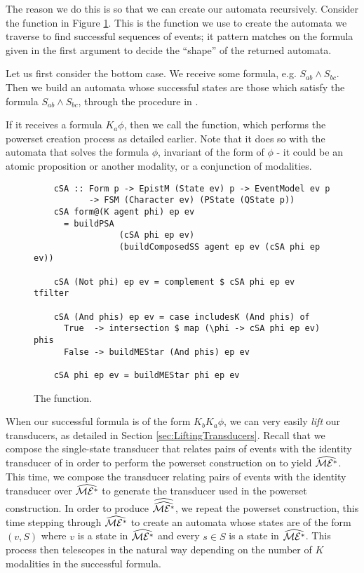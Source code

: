 \documentclass[10pt, a4paper]{report}
\begin{document}
The reason we do this is so that we can create our automata recursively.
Consider the function in Figure \ref{fig:createSolvingAutomata}. This is the
function we use to create the automata we traverse to find successful sequences
of events; it pattern matches on the formula given in the first argument to
decide the ``shape'' of the returned automata.

Let us first consider the bottom case. We receive some formula, e.g. $S_{ab}
\land S_{bc}$. Then we build an automata \mestar whose successful states are
those which satisfy the formula $S_{ab} \land S_{bc}$, through the procedure in
. 

If it receives a formula $K_a \phi$, then we call the 
function, which performs the powerset creation process as detailed earlier. Note
that it does so with the automata that solves the formula $\phi$, invariant of
the form of $\phi$ - it could be an atomic proposition or another modality, or a
conjunction of modalities. 

\begin{figure}[h]
  \centering
  \begin{verbatim}
    cSA :: Form p -> EpistM (State ev) p -> EventModel ev p
           -> FSM (Character ev) (PState (QState p))
    cSA form@(K agent phi) ep ev
      = buildPSA 
                 (cSA phi ep ev) 
                 (buildComposedSS agent ep ev (cSA phi ep ev)) 

    cSA (Not phi) ep ev = complement $ cSA phi ep ev tfilter

    cSA (And phis) ep ev = case includesK (And phis) of
      True  -> intersection $ map (\phi -> cSA phi ep ev) phis
      False -> buildMEStar (And phis) ep ev

    cSA phi ep ev = buildMEStar phi ep ev
  \end{verbatim}
  \caption{The  function.}
  \label{fig:createSolvingAutomata}
\end{figure}

When our successful formula is of the form $K_b K_a \phi$, we can very easily
\emph{lift} our transducers, as detailed in Section
\ref{sec:LiftingTransducers}. Recall that we compose the single-state transducer
that relates pairs of events with the identity transducer of \mestar in order to
perform the powerset construction on \mestar to yield $\widehat{\mathcal{ME^\ast}}$. This
time, we compose the transducer relating pairs of events with the identity
transducer over $\widehat{\mathcal{ME^\ast}}$ to generate the transducer used in the
powerset construction. In order to produce $\widehat{\widehat{\mathcal{ME^\ast}}}$, we repeat
the powerset construction, this time stepping through $\widehat{\mathcal{ME^\ast}}$ to
create an automata whose states are of the form $(v, S)$ where $v$ is a state in
$\widehat{\mathcal{ME^\ast}}$ and every $s \in S$ is a state in $\widehat{\mathcal{ME^\ast}}$. This
process then telescopes in the natural way depending on the number of $K$
modalities in the successful formula.
\end{document}
